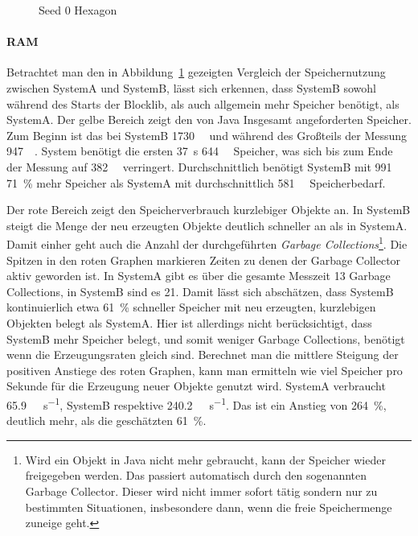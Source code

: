 \begin{figure}[!htbp]
	\caption{Seed 0 Hexagon}\label{fig:seed-0-hexagon-mem}
\end{figure} 
\paragraph{RAM} Betrachtet man den in Abbildung~\ref{fig:seed-0-hexagon-mem} gezeigten Vergleich der Speichernutzung zwischen SystemA und SystemB, lässt sich erkennen, dass SystemB sowohl während des Starts der Blocklib, als auch allgemein mehr Speicher benötigt, als SystemA. Der gelbe Bereich zeigt den von Java Insgesamt angeforderten Speicher. Zum Beginn ist das bei SystemB \SI{1730}{\mega\byte} und während des Großteils der Messung \SI{947}{\mega\byte}. System benötigt die ersten \SI{37}{\second} \SI{644}{\mega\byte} Speicher, was sich bis zum Ende der Messung auf \SI{382}{\mega\byte} verringert. Durchschnittlich benötigt SystemB mit \SI{991}{\mega\byte} \SI{71}{\percent} mehr Speicher als SystemA mit durchschnittlich \SI{581}{\mega\byte} Speicherbedarf.

Der rote Bereich zeigt den Speicherverbrauch kurzlebiger Objekte an. In SystemB steigt die Menge der neu erzeugten Objekte deutlich schneller an als in SystemA. Damit einher geht auch die Anzahl der durchgeführten \emph{Garbage Collections}\footnote{Wird ein Objekt in Java nicht mehr gebraucht, kann der Speicher wieder freigegeben werden. Das passiert automatisch durch den sogenannten Garbage Collector. Dieser wird nicht immer sofort tätig sondern nur zu bestimmten Situationen, insbesondere dann, wenn die freie Speichermenge zuneige geht.}. Die Spitzen in den roten Graphen markieren Zeiten zu denen der Garbage Collector aktiv geworden ist. In SystemA gibt es über die gesamte Messzeit 13 Garbage Collections, in SystemB sind es 21. Damit lässt sich abschätzen, dass SystemB kontinuierlich etwa \SI{61}{\percent} schneller Speicher mit neu erzeugten, kurzlebigen Objekten belegt als SystemA. Hier ist allerdings nicht berücksichtigt, dass SystemB mehr Speicher belegt, und somit  weniger Garbage Collections, benötigt wenn die Erzeugungsraten gleich sind. Berechnet man die mittlere Steigung der positiven Anstiege des roten Graphen, kann man ermitteln wie viel Speicher pro Sekunde für die Erzeugung neuer Objekte genutzt wird. SystemA verbraucht \SI{65,9}{\mega\byte\per\second}, SystemB respektive \SI{240,2}{\mega\byte\per\second}. Das ist ein Anstieg von \SI{264}{\percent}, deutlich mehr, als die geschätzten \SI{61}{\percent}.